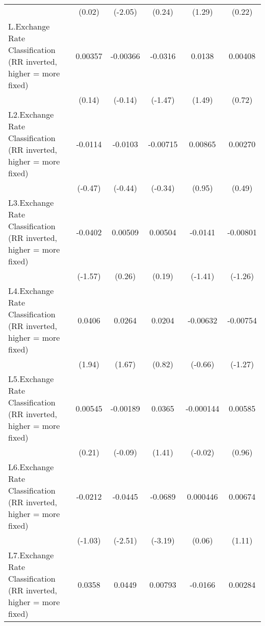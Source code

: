 {\begin{longtable}{l*{5}{c}}
                &   (0.02)         &  (-2.05)         &   (0.24)         &   (1.29)         &   (0.22)         \\
\addlinespace
L.Exchange Rate Classification (RR inverted, higher = more fixed)&  0.00357         & -0.00366         &  -0.0316         &   0.0138         &  0.00408         \\
                &   (0.14)         &  (-0.14)         &  (-1.47)         &   (1.49)         &   (0.72)         \\
\addlinespace
L2.Exchange Rate Classification (RR inverted, higher = more fixed)&  -0.0114         &  -0.0103         & -0.00715         &  0.00865         &  0.00270         \\
                &  (-0.47)         &  (-0.44)         &  (-0.34)         &   (0.95)         &   (0.49)         \\
\addlinespace
L3.Exchange Rate Classification (RR inverted, higher = more fixed)&  -0.0402         &  0.00509         &  0.00504         &  -0.0141         & -0.00801         \\
                &  (-1.57)         &   (0.26)         &   (0.19)         &  (-1.41)         &  (-1.26)         \\
\addlinespace
L4.Exchange Rate Classification (RR inverted, higher = more fixed)&   0.0406         &   0.0264         &   0.0204         & -0.00632         & -0.00754         \\
                &   (1.94)         &   (1.67)         &   (0.82)         &  (-0.66)         &  (-1.27)         \\
\addlinespace
L5.Exchange Rate Classification (RR inverted, higher = more fixed)&  0.00545         & -0.00189         &   0.0365         &-0.000144         &  0.00585         \\
                &   (0.21)         &  (-0.09)         &   (1.41)         &  (-0.02)         &   (0.96)         \\
\addlinespace
L6.Exchange Rate Classification (RR inverted, higher = more fixed)&  -0.0212         &  -0.0445\sym{*}  &  -0.0689\sym{**} & 0.000446         &  0.00674         \\
                &  (-1.03)         &  (-2.51)         &  (-3.19)         &   (0.06)         &   (1.11)         \\
\addlinespace
L7.Exchange Rate Classification (RR inverted, higher = more fixed)&   0.0358         &   0.0449\sym{*}  &  0.00793         &  -0.0166\sym{*}  &  0.00284         \\

\end{longtable}}
